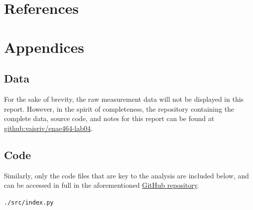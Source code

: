 \section{References} \label{sec:references}

\printbibliography[heading=none]

\section{Appendices} \label{sec:appendices}

\subsection{Data} \label{sec:appendices/data}

For the sake of brevity, the raw measurement data will not be displayed in this report. However, in the spirit of completeness, the repository containing the complete data, source code, and notes for this report can be found at \href{https://www.github.com/vaisriv/enae464-lab04}{github:vaisriv/enae464-lab04}.

\subsection{Code} \label{sec:appendices/code}

Similarly, only the code files that are key to the analysis are included below, and can be accessed in full in the aforementioned \href{https://www.github.com/vaisriv/enae464-lab04}{GitHub repository}.

\begin{codeblock}
    \centering
    \caption{PIV Data Analysis Script}
    \texttt{./src/index.py}
    \inputminted{python}{../src/index.py}
    \label{lst:code/index}
\end{codeblock}

\nocite{*}


